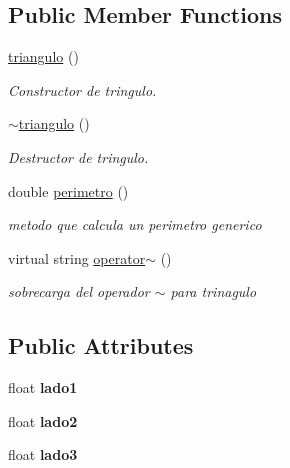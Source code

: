 \subsection*{Public Member Functions}
\begin{DoxyCompactItemize}
\item 
\mbox{\label{classtriangulo_acf725d8856047c7f34f3cc120845d61f}} 
\hyperlink{classtriangulo_acf725d8856047c7f34f3cc120845d61f}{triangulo} ()
\begin{DoxyCompactList}\small\item\em Constructor de tringulo. \end{DoxyCompactList}\item 
\mbox{\label{classtriangulo_a8af9d6bbfd02ed3a82bd30147958ac34}} 
\hyperlink{classtriangulo_a8af9d6bbfd02ed3a82bd30147958ac34}{$\sim$triangulo} ()
\begin{DoxyCompactList}\small\item\em Destructor de tringulo. \end{DoxyCompactList}\item 
\mbox{\label{classtriangulo_a3e689f3bb9dad9e17766aa2adb060c16}} 
double \hyperlink{classtriangulo_a3e689f3bb9dad9e17766aa2adb060c16}{perimetro} ()
\begin{DoxyCompactList}\small\item\em metodo que calcula un perimetro generico \end{DoxyCompactList}\item 
\mbox{\label{classtriangulo_a21620f40b213174d311380b0343777cb}} 
virtual string \hyperlink{classtriangulo_a21620f40b213174d311380b0343777cb}{operator$\sim$} ()
\begin{DoxyCompactList}\small\item\em sobrecarga del operador $\sim$ para trinagulo \end{DoxyCompactList}\end{DoxyCompactItemize}
\subsection*{Public Attributes}
\begin{DoxyCompactItemize}
\item 
\mbox{\label{classtriangulo_a938be48c572df73b6cc2aa18f83b83c4}} 
float {\bfseries lado1}
\item 
\mbox{\label{classtriangulo_ab4441e41406099469c085abb287f9b8c}} 
float {\bfseries lado2}
\item 
\mbox{\label{classtriangulo_aff3acd0f532f7c2e8bac5c2709124433}} 
float {\bfseries lado3}
\end{DoxyCompactItemize}
